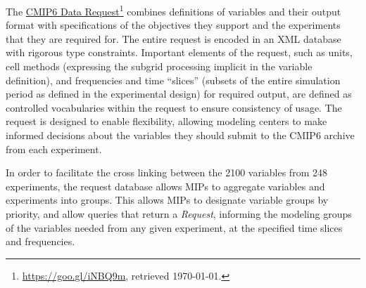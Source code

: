 \documentclass[gmd,manuscript]{copernicus}
\newcommand{\urlref}[2] {\href{#1}{#2}\footnote{\url{#1}, retrieved \today.}}
\begin{document}
The \urlref{https://goo.gl/iNBQ9m}{CMIP6 Data Request}
\citep{ref:juckesetal2015} combines definitions of variables and their
output format with specifications of the objectives they support and
the experiments that they are required for. The entire request is
encoded in an XML database with rigorous type constraints. Important
elements of the request, such as units, cell methods (expressing the
subgrid processing implicit in the variable definition), and
frequencies and time ``slices'' (subsets of the entire simulation
period as defined in the experimental design) for required output, are
defined as controlled vocabularies within the request to ensure
consistency of usage. The request is designed to enable flexibility,
allowing modeling centers to make informed decisions about the
variables they should submit to the CMIP6 archive from each
experiment.



In order to facilitate the cross linking between the 2100 variables
from 248 experiments, the request database allows MIPs to aggregate
variables and experiments into groups. This allows MIPs to designate
variable groups by priority, and allow queries that return a
\emph{Request}, informing the modeling groups of the variables needed
from any given experiment, at the specified time slices and
frequencies.

\end{document}
